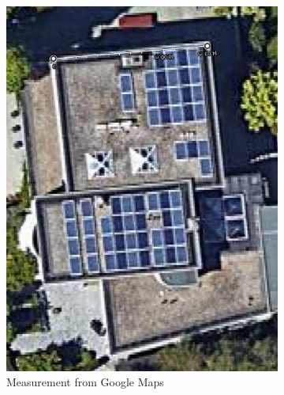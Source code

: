 \begin{figure}[H]
\begin{subfigure}[t]{.3\textwidth}
		\includegraphics[width=0.9\linewidth]{images/house_google_maps}
		\caption{Measurement from Google Maps}
		\label{fig:house_google_maps}
	\end{subfigure} \quad
	\begin{subfigure}[t]{.3\textwidth}
		\centering

\end{subfigure}
\end{figure}

